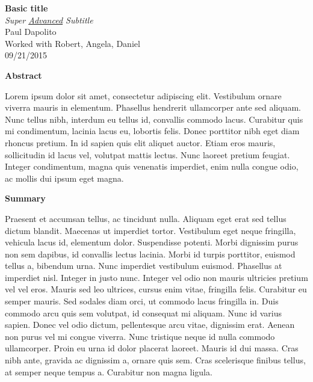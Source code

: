 \documentclass[letterpaper, boxed]{hmcpset}
\begin{document}
    \begin{center}
        \Large{\textbf{Basic title}} \\ 
        \textit{Super \underline{Advanced} Subtitle} \\
        \large{Paul Dapolito} \\
        \large{Worked with Robert, Angela, Daniel} \\
        \large{09/21/2015}
    \end{center}

    \large \begin{flushleft}
    \textbf{Abstract}
    \end{flushleft}
    \normalsize
        Lorem ipsum dolor sit amet, consectetur adipiscing elit. Vestibulum ornare viverra mauris in elementum. Phasellus hendrerit ullamcorper ante sed aliquam. Nunc tellus nibh, interdum eu tellus id, convallis commodo lacus. Curabitur quis mi condimentum, lacinia lacus eu, lobortis felis. Donec porttitor nibh eget diam rhoncus pretium. In id sapien quis elit aliquet auctor. Etiam eros mauris, sollicitudin id lacus vel, volutpat mattis lectus. Nunc laoreet pretium feugiat. Integer condimentum, magna quis venenatis imperdiet, enim nulla congue odio, ac mollis dui ipsum eget magna.

    \large \begin{flushleft}
    \textbf{Summary}
    \end{flushleft}
    \normalsize
        Praesent et accumsan tellus, ac tincidunt nulla. Aliquam eget erat sed tellus dictum blandit. Maecenas ut imperdiet tortor. Vestibulum eget neque fringilla, vehicula lacus id, elementum dolor. Suspendisse potenti. Morbi dignissim purus non sem dapibus, id convallis lectus lacinia. Morbi id turpis porttitor, euismod tellus a, bibendum urna. Nunc imperdiet vestibulum euismod. Phasellus at imperdiet nisl. Integer in justo nunc. Integer vel odio non mauris ultricies pretium vel vel eros. Mauris sed leo ultrices, cursus enim vitae, fringilla felis. Curabitur eu semper mauris. Sed sodales diam orci, ut commodo lacus fringilla in. Duis commodo arcu quis sem volutpat, id consequat mi aliquam.
        Nunc id varius sapien. Donec vel odio dictum, pellentesque arcu vitae, dignissim erat. Aenean non purus vel mi congue viverra. Nunc tristique neque id nulla commodo ullamcorper. Proin eu urna id dolor placerat laoreet. Mauris id dui massa. Cras nibh ante, gravida ac dignissim a, ornare quis sem. Cras scelerisque finibus tellus, at semper neque tempus a. Curabitur non magna ligula.
\end{document}
